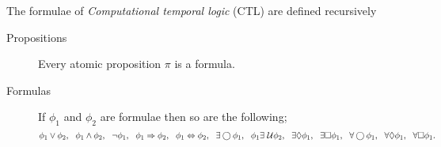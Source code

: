 \begin{defi}
    The formulae of \emph{Computational temporal logic} (CTL) are defined recursively
\begin{description}
    \item[Propositions]{Every atomic proposition $\pi$ is a formula.}
    \item[Formulas]{If $\phi_{1}$ and $\phi_{2}$ are formulae then so are the following;
        \[
        \phi_{1} \lor \phi_{2},\ \ \phi_{1} \land \phi_{2}, \ \ \lnot \phi_{1}, \ \
        \phi_{1} \Rightarrow \phi_{2},\ \ \phi_{1} \Leftrightarrow \phi_{2}, \ \
        \exists\bigcirc \phi_{1}, \ \ \phi_{1} \exists\until \phi_{2}, \ \
        \exists\lozenge \phi_{1}, \ \ \exists\square \phi_{1}, \ \ \forall\bigcirc \phi_{1}, \ \
        \forall\lozenge \phi_{1}, \ \ \forall\square \phi_{1}.
        \]}
\end{description}
\end{defi}

